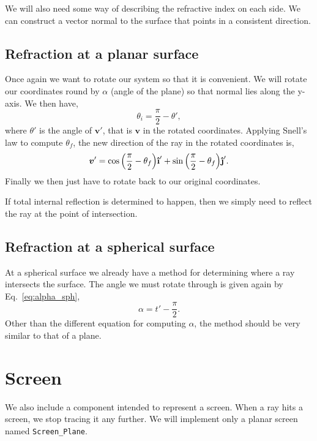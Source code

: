 \documentclass{article}
\let\vec \bm
\newcommand{\uveci}{{\bm{\hat{\textnormal{\bfseries\i}}}}}
\newcommand{\uvecj}{{\bm{\hat{\textnormal{\bfseries\j}}}}}
\begin{document}
We will also need some way of describing the refractive index on each side. We can construct a vector normal to the surface that points in a consistent direction.

\subsection{Refraction at a planar surface}
Once again we want to rotate our system so that it is convenient. We will rotate our coordinates round by $\alpha$ (angle of the plane) so that normal lies along the y-axis. We then have,
\begin{equation}
    \theta_i 
    =
    \frac{\pi}{2} - \theta',
\end{equation}
where $\theta'$ is the angle of $\vec{v}'$, that is $\vec v$ in the rotated coordinates. Applying Snell's law to compute $\theta_f$, the new direction of the ray in the rotated coordinates is,
\begin{equation}
    \vec{v}'
    = 
    \cos{
    \left(
        \frac{\pi}{2} - \theta_f
    \right)
    } \uveci'
    +
    \sin{
    \left(
        \frac{\pi}{2} - \theta_f
    \right)
    } \uvecj'.
\end{equation}
Finally we then just have to rotate back to our original coordinates. 

If total internal reflection is determined to happen, then we simply need to reflect the ray at the point of intersection.

\subsection{Refraction at a spherical surface}
At a spherical surface we already have a method for determining where a ray intersects the surface. The angle we must rotate through is given again by Eq.~\ref{eq:alpha_sph},
\begin{equation}
    \alpha = t' - \frac{\pi}{2}.
\end{equation}
Other than the different equation for computing $\alpha$, the method should be very similar to that of a plane.

\section{Screen}
We also include a component intended to represent a screen. When a ray hits a screen, we stop tracing it any further. We will implement only a planar screen named \texttt{Screen\_Plane}.
\end{document}

